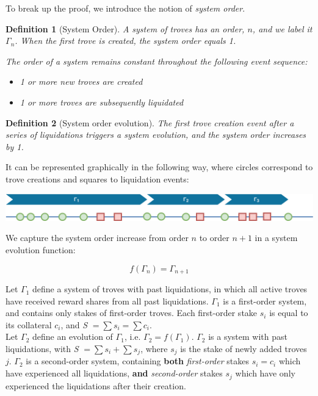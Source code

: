 \documentclass[reqno]{article}
\newtheorem{definition}{Definition}[section]
\begin{document}
To break up the proof, we introduce the notion of \textit{system order}. 

\begin{definition}[System Order]
  A system of troves has an order, $n$, and we label it $\Gamma_n$. When the first trove is created, the system order equals 1.

  The order of a system remains constant throughout the following event sequence:

\begin{itemize}
  \item 1 or more new troves are created 
  \item 1 or more troves are subsequently liquidated
\end{itemize}
\end{definition}

\begin{definition}[System order evolution]
  The first trove creation event after a series of liquidations triggers a system evolution, and the system order increases by 1.
\end{definition}

It can be represented graphically in the following way, where circles correspond to trove creations and squares to liquidation events:

\includegraphics[width=\linewidth]{System_order_evolution_generic.png}

We capture the system order increase from order $n$ to order $n+1$  in a system evolution function:

\begin{equation} 
    f(\Gamma_n)=\Gamma_{n+1}
\end{equation}

\bigskip
Let $\Gamma_1$ define a system of troves with past liquidations, in which all active troves have received reward shares from all past liquidations. $\Gamma_1$ is a first-order system, and contains only stakes of first-order troves. Each first-order stake $s_i$ is equal to its collateral $c_i$, and \textit{S} $= \sum s_i = \sum c_i$.\\

Let $\Gamma_2$ define an evolution of $\Gamma_1$, i.e. $\Gamma_2 = f(\Gamma_1)$. $\Gamma_2$ is a system with past liquidations, with \textit{S} $= \sum s_i + \sum s_j$, where $s_j$ is the stake of newly added troves $j$. $\Gamma_2$ is a second-order system, containing \textbf{both} \textit{first-order} stakes $s_i = c_i$ which have experienced all liquidations, \textbf{and} \textit{second-order} stakes $s_j$ which have only experienced the liquidations after their creation.\\
\end{document}
